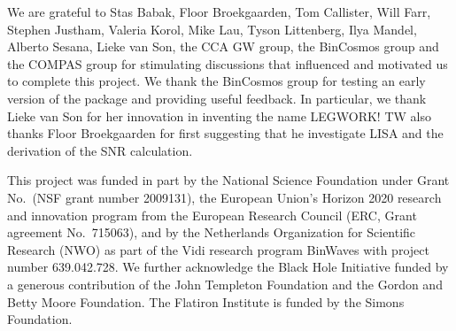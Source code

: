 \documentclass[twocolumn]{aastex631}
\newcommand{\lw}{LEGWORK}
\begin{document}
\begin{acknowledgements}
    We are grateful to Stas Babak, Floor Broekgaarden, Tom Callister, Will Farr, Stephen Justham, Valeria Korol, Mike Lau, Tyson Littenberg, Ilya Mandel, Alberto Sesana, Lieke van Son, the CCA GW group, the BinCosmos group and the COMPAS group for stimulating discussions that influenced and motivated us to complete this project. We thank the BinCosmos group for testing an early version of the package and providing useful feedback. In particular, we thank Lieke van Son for her innovation in inventing the name \lw{}! TW also thanks Floor Broekgaarden for first suggesting that he investigate LISA and the derivation of the SNR calculation.
    
    This project was funded in part by the National Science Foundation under Grant No.\ (NSF grant number 2009131), the European Union’s Horizon 2020 research and innovation program from the European Research Council (ERC, Grant agreement No.\ 715063), and by the Netherlands Organization for Scientific Research (NWO) as part of the Vidi research program BinWaves with project number 639.042.728. We further acknowledge the Black Hole Initiative funded by a generous contribution of the John Templeton Foundation and the Gordon and Betty Moore Foundation. The Flatiron Institute is funded by the Simons Foundation.
\end{acknowledgements}



\end{document}

